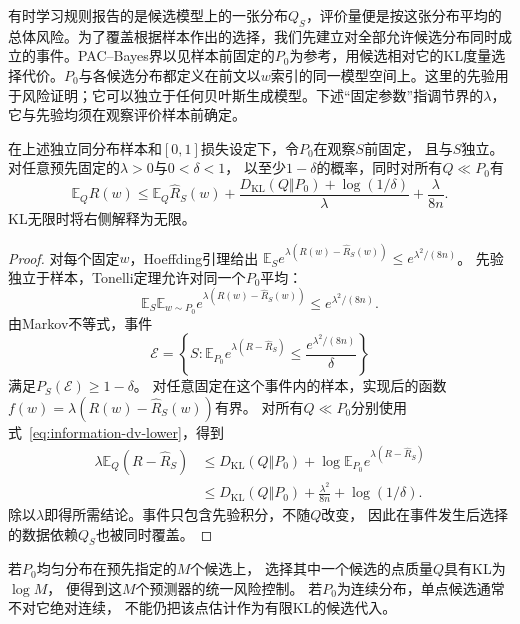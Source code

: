 有时学习规则报告的是候选模型上的一张分布\(Q_S\)，评价量便是按这张分布平均的总体风险。为了覆盖根据样本作出的选择，我们先建立对全部允许候选分布同时成立的事件。PAC--Bayes界以见样本前固定的\(P_0\)为参考，用候选相对它的KL度量选择代价。\(P_0\)与各候选分布都定义在前文以\(w\)索引的同一模型空间上。这里的先验用于风险证明；它可以独立于任何贝叶斯生成模型。下述“固定参数”指调节界的\(\lambda\)，它与先验均须在观察评价样本前确定。

\begin{theorem}
\label{thm:information-pac-bayes-basic}
在上述独立同分布样本和\([0,1]\)损失设定下，令\(P_0\)在观察\(S\)前固定，
且与\(S\)独立。对任意预先固定的\(\lambda>0\)与\(0<\delta<1\)，
以至少\(1-\delta\)的概率，同时对所有\(Q\ll P_0\)有
\begin{equation}
  \mathbb E_QR(w)
  \leq\mathbb E_Q\widehat R_S(w)
  +\frac{D_{\mathrm{KL}}(Q\Vert P_0)+\log(1/\delta)}{\lambda}
  +\frac{\lambda}{8n}.
  \label{eq:information-pac-bayes-basic}
\end{equation}
KL无限时将右侧解释为无限。
\end{theorem}
\begin{proof}
对每个固定\(w\)，Hoeffding引理给出
\(\mathbb E_Se^{\lambda(R(w)-\widehat R_S(w))}
\leq e^{\lambda^2/(8n)}\)。
先验独立于样本，Tonelli定理允许对同一个\(P_0\)平均：
\[
  \mathbb E_S\mathbb E_{w\sim P_0}
  e^{\lambda(R(w)-\widehat R_S(w))}
  \leq e^{\lambda^2/(8n)}.
\]
由Markov不等式，事件
\[
  \mathcal E=
  \left\{S:\mathbb E_{P_0}e^{\lambda(R-\widehat R_S)}
  \leq\frac{e^{\lambda^2/(8n)}}{\delta}\right\}
\]
满足\(P_S(\mathcal E)\geq1-\delta\)。
对任意固定在这个事件内的样本，实现后的函数
\(f(w)=\lambda(R(w)-\widehat R_S(w))\)有界。
对所有\(Q\ll P_0\)分别使用式~\eqref{eq:information-dv-lower}，得到
\[
\begin{aligned}
  \lambda\mathbb E_Q(R-\widehat R_S)
  &\leq D_{\mathrm{KL}}(Q\Vert P_0)
       +\log\mathbb E_{P_0}e^{\lambda(R-\widehat R_S)}\\
  &\leq D_{\mathrm{KL}}(Q\Vert P_0)
       +\frac{\lambda^2}{8n}+\log(1/\delta).
\end{aligned}
\]
除以\(\lambda\)即得所需结论。事件只包含先验积分，不随\(Q\)改变，
因此在事件发生后选择的数据依赖\(Q_S\)也被同时覆盖。
\end{proof}

若\(P_0\)均匀分布在预先指定的\(M\)个候选上，
选择其中一个候选的点质量\(Q\)具有KL为\(\log M\)，
便得到这\(M\)个预测器的统一风险控制。
若\(P_0\)为连续分布，单点候选通常不对它绝对连续，
不能仍把该点估计作为有限KL的候选代入。

